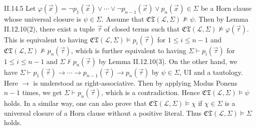 \documentclass[12pt]{article}
\begin{document}
\begin{customthm}{II.14.5}
  Let $\varphi(\vec{x})=\neg p_1(\vec{x})\vee\cdots\vee\neg p_{n-1}(\vec{x})\vee p_n(\vec{x})\in\Sigma$ be a Horn clause whose universal closure is $\psi\in\Sigma$. Assume that $\mathfrak{CT}(\mathcal{L},\Sigma)\not\models\psi$. Then by Lemma II.12.10(2), there exist a tuple $\vec{\tau}$ of closed terms such that $\mathfrak{CT}(\mathcal{L},\Sigma)\not\models\varphi(\vec{\tau})$. This is equivalent to having $\mathfrak{CT}(\mathcal{L},\Sigma)\models p_i(\vec{\tau})$ for $1\leq i\leq n-1$ and $\mathfrak{CT}(\mathcal{L},\Sigma)\not\models p_n(\vec{\tau})$, which is further equivalent to having $\Sigma\vdash p_i(\vec{\tau})$ for $1\leq i\leq n-1$ and $\Sigma\not\vdash p_n(\vec{\tau})$ by Lemma II.12.10(3). On the other hand, we have $\Sigma\vdash p_1(\vec{\tau})\rightarrow\cdots\rightarrow p_{n-1}(\vec{\tau})\rightarrow p_n(\vec{\tau})$ by $\psi\in\Sigma$, UI and a tautology. Here $\rightarrow$ is understood as right-associative. Then by applying Modus Ponens $n-1$ times, we get $\Sigma\vdash p_n(\vec{\tau})$, which is a contradiction. Hence $\mathfrak{CT}(\mathcal{L},\Sigma)\models\psi$ holds. In a similar way, one can also prove that $\mathfrak{CT}(\mathcal{L},\Sigma)\models\chi$ if $\chi\in\Sigma$ is a universal closure of a Horn clause without a positive literal. Thus $\mathfrak{CT}(\mathcal{L},\Sigma)\models\Sigma$ holds.
\end{customthm}
\end{document}
